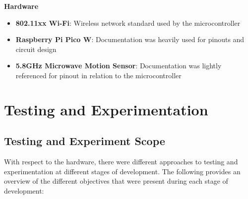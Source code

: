 \documentclass[conference]{IEEEtran}
\begin{document}
\textbf{Hardware}
\begin{itemize}
      \item \textbf{802.11xx Wi-Fi}: Wireless network standard used by the
            microcontroller
      \item \textbf{Raspberry Pi Pico W}: Documentation was heavily used for pinouts
            and circuit design \cite{picoW_docs2016}
      \item \textbf{5.8GHz Microwave Motion Sensor}: Documentation was lightly
            referenced for pinout in relation to the microcontroller \cite{CQRobot_specs2016}
\end{itemize}

\section{Testing and Experimentation}

\subsection{Testing and Experiment Scope}

With respect to the hardware, there were different approaches
to testing and experimentation
at different stages of development. The following provides an overview of
the different objectives that were present during each stage of development:
\end{document}
